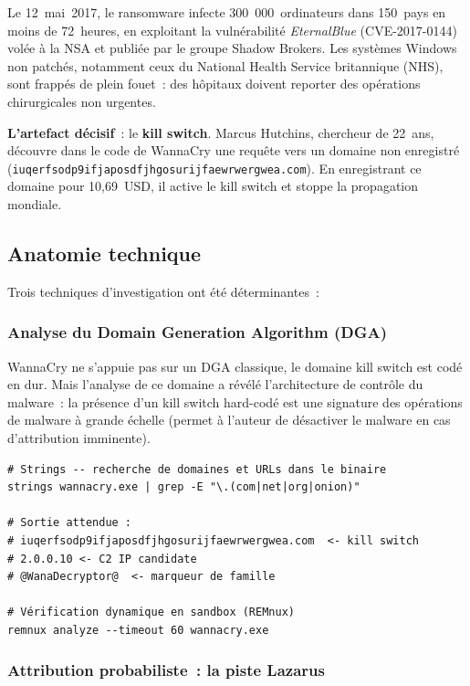 Le 12~mai~2017, le ransomware  infecte 300~000~ordinateurs
dans 150~pays en moins de 72~heures, en exploitant la vulnérabilité
\textit{EternalBlue} (CVE-2017-0144) volée à la NSA et publiée par le
groupe Shadow Brokers. Les systèmes Windows non patchés, notamment ceux du
National Health Service britannique (NHS), sont frappés de plein fouet~:
des hôpitaux doivent reporter des opérations chirurgicales non urgentes.

\medskip

\textbf{L'artefact décisif}~: le \textbf{kill switch}. Marcus Hutchins,
chercheur de 22~ans, découvre dans le code de WannaCry une requête vers un
domaine non enregistré (\texttt{iuqerfsodp9ifjaposdfjhgosurijfaewrwergwea.com}).
En enregistrant ce domaine pour 10,69~USD, il active le kill switch et stoppe
la propagation mondiale.

\subsection{Anatomie technique}

Trois techniques d'investigation ont été déterminantes~:

\subsubsection{Analyse du Domain Generation Algorithm (DGA)}

WannaCry ne s'appuie pas sur un DGA classique, le domaine kill switch
est codé en dur. Mais l'analyse de ce domaine a révélé l'architecture de
contrôle du malware~: la présence d'un kill switch hard-codé est une
signature des opérations de malware à grande échelle (permet à l'auteur de
désactiver le malware en cas d'attribution imminente).

\begin{lstlisting}[language=bash_forensique,
    caption={Extraction du kill switch depuis un binaire WannaCry}]
# Strings -- recherche de domaines et URLs dans le binaire
strings wannacry.exe | grep -E "\.(com|net|org|onion)"

# Sortie attendue :
# iuqerfsodp9ifjaposdfjhgosurijfaewrwergwea.com  <- kill switch
# 2.0.0.10 <- C2 IP candidate
# @WanaDecryptor@  <- marqueur de famille

# Vérification dynamique en sandbox (REMnux)
remnux analyze --timeout 60 wannacry.exe
\end{lstlisting}

\subsubsection{Attribution probabiliste~: la piste Lazarus}

